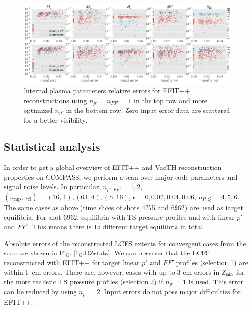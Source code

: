 \begin{figure}
\centering   %
\hfill{}
\includegraphics[width=18cm]{figures/kinetic_stats_opt.pdf}
\hfill{}
\caption{Internal plasma parameters relative errors for EFIT++ reconstructions using $n_{p'}=n_{FF'}=1$ in the top row and more optimized $n_{p'}$ in the bottom row. Zero input error data are scattered for a better visibility.}
\label{fig:kinetic_stats}
\end{figure}


\subsection{Statistical analysis} %
\label{sub:statistical_analysis}

In order to get a global overview of EFIT++ and VacTH reconstruction properties on COMPASS, we perform a scan over major code parameters and signal noise levels. In particular, $n_{p',FF'} = 1,2 $, $(n_\mathrm{mp}, n_\mathrm{fl}) = (16, 4), (64, 4), (8, 16)$, $\epsilon = 0, 0.02, 0.04, 0.06$, $n_{P,Q} = 4, 5, 6$. The same cases as above (time slices of shots 4275 and 6962) are used as target equilibria. For shot 6962, equilibria with TS pressure profiles and with linear $p'$ and $FF'$. This means there is 15 different target equilibria in total.

Absolute errors of the reconstructed LCFS extents for convergent cases from the scan are shown in Fig. \ref{fig:RZstats}. We can observer that the LCFS reconstructed with EFIT++ for target linear $p'$ and $FF'$ profiles (selection 1) are within 1~cm errors. There are, however, cases with up to 3 cm errors in $Z_{\rm{min}}$ for the more realistic TS pressure profiles (selection 2) if $n_{p'}=1$ is used. This error can be reduced by using $n_{p'}=2$. Input errors do not pose major difficulties for EFIT++. 

